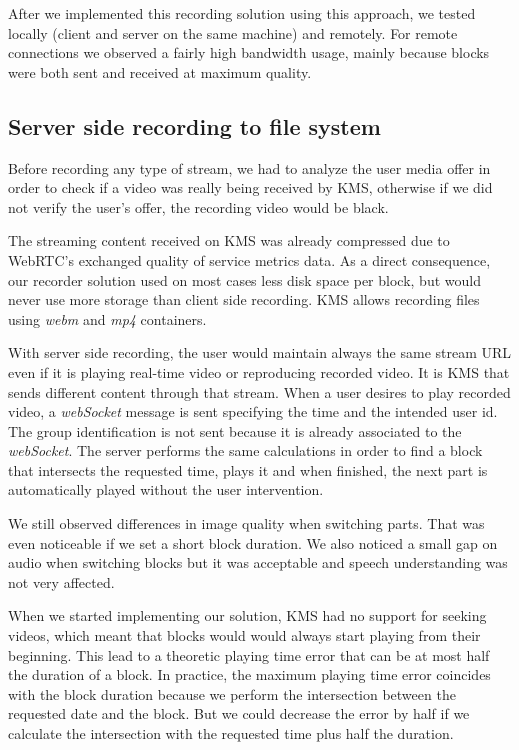 	After we implemented this recording solution using this approach, we tested locally (client and server on the same machine) and remotely. For remote connections we observed a fairly high bandwidth usage, mainly because blocks were both sent and received at maximum quality. 
        
\subsection{Server side recording to file system}

Before recording any type of stream, we had to analyze the user media offer in order to check if a video was really being received by \ac{KMS}, otherwise if we did not verify the user's offer, the recording video would be black.

The streaming content received on \ac{KMS} was already compressed due to \ac{WebRTC}'s exchanged quality of service metrics data. As a direct consequence, our recorder solution used on most cases less disk space per block, but would never use more storage than client side recording. \ac{KMS} allows recording files using \emph{webm} and \emph{mp4} containers.

	With server side recording, the user would maintain always the same stream \ac{URL} even if it is playing real-time video or reproducing recorded video. It is \ac{KMS} that sends different content through that stream. When a user desires to play recorded video, a \emph{webSocket} message is sent specifying the time and the intended user id. The group identification is not sent because it is already associated to the \emph{webSocket}. The server performs the same calculations in order to find a block that intersects the requested time, plays it and when finished, the next part is automatically played without the user intervention.

	We still observed differences in image quality when switching parts. That was even noticeable if we set a short block duration. We also noticed a small gap on audio when switching blocks but it was acceptable and speech understanding was not very affected. 

	When we started implementing our solution, \ac{KMS} had no support for seeking videos, which meant that blocks would would always start playing from their beginning. This lead to a theoretic playing time error that can be at most half the duration of a block. In practice, the maximum playing time error coincides with the block duration because we perform the intersection between the requested date and the block. But we could decrease the error by half if we calculate the intersection with the requested time plus half the duration.

